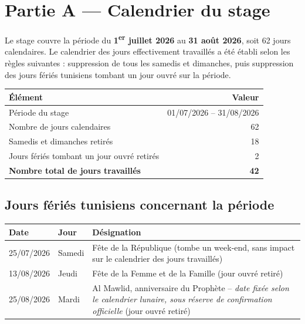 \documentclass[11pt,a4paper]{article}
\begin{document}
\tableofcontents
\newpage

\section*{Partie A --- Calendrier du stage}

Le stage couvre la période du \textbf{1\textsuperscript{er} juillet 2026} au \textbf{31 août 2026}, soit 62 jours calendaires. Le calendrier des jours effectivement travaillés a été établi selon les règles suivantes : suppression de tous les samedis et dimanches, puis suppression des jours fériés tunisiens tombant un jour ouvré sur la période.

\begin{center}
\renewcommand{\arraystretch}{1.3}
\begin{tabularx}{0.85\linewidth}{X r}
\toprule
\textbf{Élément} & \textbf{Valeur} \\
\midrule
Période du stage & 01/07/2026 -- 31/08/2026 \\
Nombre de jours calendaires & 62 \\
Samedis et dimanches retirés & 18 \\
Jours fériés tombant un jour ouvré retirés & 2 \\
\textbf{Nombre total de jours travaillés} & \textbf{42} \\
\bottomrule
\end{tabularx}
\end{center}

\subsection*{Jours fériés tunisiens concernant la période}
\begin{center}
\renewcommand{\arraystretch}{1.3}
\begin{tabularx}{\linewidth}{l l X}
\toprule
\textbf{Date} & \textbf{Jour} & \textbf{Désignation} \\
\midrule
25/07/2026 & Samedi & Fête de la République (tombe un week-end, sans impact sur le calendrier des jours travaillés) \\
13/08/2026 & Jeudi & Fête de la Femme et de la Famille (jour ouvré retiré) \\
25/08/2026 & Mardi & Al Mawlid, anniversaire du Prophète -- \textit{date fixée selon le calendrier lunaire, sous réserve de confirmation officielle} (jour ouvré retiré) \\
\bottomrule
\end{tabularx}
\end{center}
\end{document}
